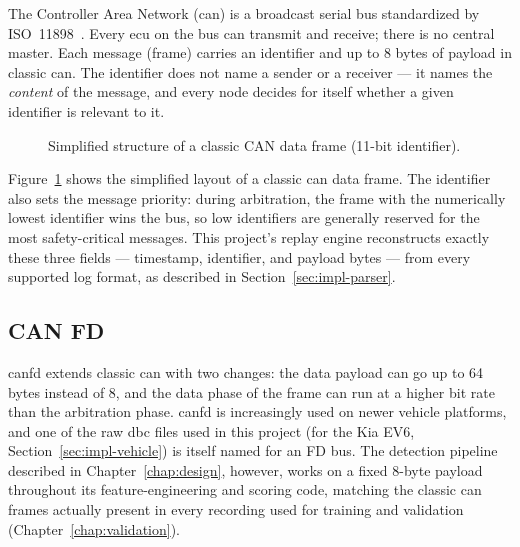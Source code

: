 The Controller Area Network (\gls{can}) is a broadcast serial bus standardized by ISO~11898~\cite{iso11898}. Every \gls{ecu} on the bus can transmit and receive; there is no central master. Each message (frame) carries an identifier and up to 8 bytes of payload in classic \gls{can}. The identifier does not name a sender or a receiver — it names the \emph{content} of the message, and every node decides for itself whether a given identifier is relevant to it.

\begin{figure}[H]
\centering
{}
\caption{Simplified structure of a classic CAN data frame (11-bit identifier).}
\label{fig:can-frame}
\end{figure}

Figure~\ref{fig:can-frame} shows the simplified layout of a classic \gls{can} data frame. The identifier also sets the message priority: during arbitration, the frame with the numerically lowest identifier wins the bus, so low identifiers are generally reserved for the most safety-critical messages. This project's replay engine reconstructs exactly these three fields — timestamp, identifier, and payload bytes — from every supported log format, as described in Section~\ref{sec:impl-parser}.

\subsection{CAN FD}

\gls{canfd} extends classic \gls{can} with two changes: the data payload can go up to 64 bytes instead of 8, and the data phase of the frame can run at a higher bit rate than the arbitration phase. \gls{canfd} is increasingly used on newer vehicle platforms, and one of the raw \gls{dbc} files used in this project (for the Kia EV6, Section~\ref{sec:impl-vehicle}) is itself named for an FD bus. The detection pipeline described in Chapter~\ref{chap:design}, however, works on a fixed 8-byte payload throughout its feature-engineering and scoring code, matching the classic \gls{can} frames actually present in every recording used for training and validation (Chapter~\ref{chap:validation}).

